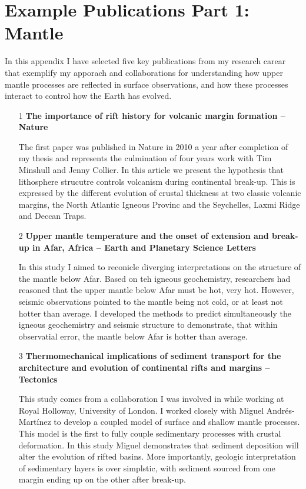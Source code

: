 \chapter{Example Publications Part 1: Mantle}

In this appendix I have selected five key publications from my research carear that exemplify my apporach and collaborations for understanding how upper mantle processes are reflected in surface observations, and how these processes interact to control how the Earth has evolved.

\begin{itemize}

\item[1] {\bf The importance of rift history for volcanic margin formation -- Nature}

The first paper was published in Nature in 2010 a year after completion of my thesis and represents the culmination of four years work with Tim Minshull and Jenny Collier. In this article we present the hypothesis that lithosphere strucutre controls volcanism during continental break-up. This is expressed by the different evolution of crustal thickness at two classic volcanic margins, the North Atlantic Igneous Provinc and the Seychelles, Laxmi Ridge and Deccan Traps.

\item[2] {\bf Upper mantle temperature and the onset of extension and break-up in Afar, Africa -- Earth and Planetary Science Letters}

In this study I aimed to reconicle diverging interpretations on the structure of the mantle below Afar. Based on teh igneous geochemistry, researchers had reasoned that the upper mantle below Afar must be hot, very hot. However, seismic observations pointed to the mantle being not cold, or at least not hotter than average. I developed the methods to predict simultaneously the igneous geochemistry and seismic structure to demonstrate, that within observatial error, the mantle below Afar is hotter than average.

\item[3] {\bf Thermomechanical implications of sediment transport for the architecture and evolution of continental rifts and margins -- Tectonics}

This study comes from a collaboration I was involved in while working at Royal Holloway, University of London. I worked closely with Miguel Andrés-Mart\'inez to develop a coupled model of surface and shallow mantle processes. This model is the first to fully couple sedimentary processes with crustal deformation. In this study Miguel demonstrates that sediment deposition will alter the evolution of rifted basins. More importantly, geologic interpretation of sedimentary layers is over simplstic, with sediment sourced from one margin ending up on the other after break-up.


\end{itemize}
